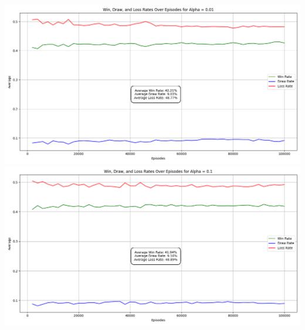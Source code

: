 \documentclass{article}
\begin{document}
\begin{center}
    \includegraphics[scale=0.4]{Win_Draw_Loss_Rates_Alpha_0.01.png}
    \includegraphics[scale=0.4]{Win_Draw_Loss_Rates_Alpha_0.1.png}
\end{center}\par 
\end{document}
